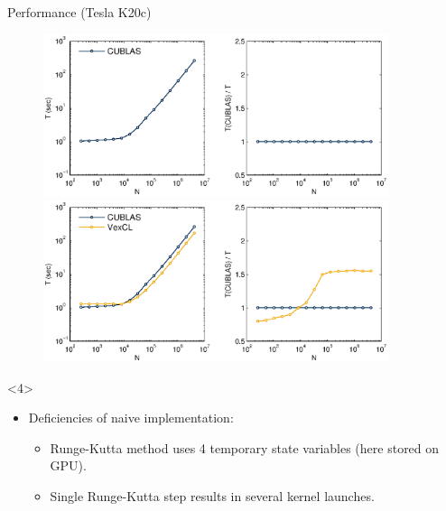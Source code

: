 \documentclass[@BEAMER_OPTIONS@]{beamer}
\begin{document}
\begin{frame}[fragile]{Performance (Tesla K20c)}
    \begin{figure}
         {\includegraphics[width=0.9\textwidth]{perfcmp-1}}%
         {\includegraphics[width=0.9\textwidth]{perfcmp-2}}%
    \end{figure}
    \begin{uncoverenv}<4>
        \begin{itemize}
            \item Deficiencies of naive implementation:
                \begin{itemize}
                    \item Runge-Kutta method uses 4 temporary state variables
                        (here stored on GPU).
                    \item Single Runge-Kutta step results in several kernel
                        launches.
                \end{itemize}
        \end{itemize}
    \end{uncoverenv}
\end{frame}
\end{document}
